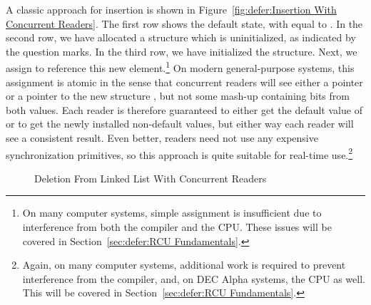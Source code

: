 A classic approach for insertion is shown in
Figure~\ref{fig:defer:Insertion With Concurrent Readers}.
The first row shows the default state, with  equal to .
In the second row, we have allocated a structure which is uninitialized,
as indicated by the question marks.
In the third row, we have initialized the structure.
Next, we assign  to reference this new element.\footnote{
	On many computer systems, simple assignment is insufficient
	due to interference from both the compiler and the CPU.
	These issues will be covered in
	Section~\ref{sec:defer:RCU Fundamentals}.}
On modern general-purpose systems, this assignment is atomic in the
sense that concurrent readers will see either a  pointer
or a pointer to the new structure , but not some mash-up
containing bits from both values.
Each reader is therefore guaranteed to either get the
default value of  or to get the newly installed
non-default values, but either way each reader will see
a consistent result.
Even better, readers need not use any expensive synchronization
primitives, so this approach is quite suitable for real-time use.\footnote{
	Again, on many computer systems, additional work is required
	to prevent interference from the compiler, and, on DEC Alpha
	systems, the CPU as well.
	This will be covered in
	Section~\ref{sec:defer:RCU Fundamentals}.}

\begin{figure}[tb]
\centering
{}
\caption{Deletion From Linked List With Concurrent Readers}
\label{fig:defer:Deletion From Linked List With Concurrent Readers}
\end{figure}

